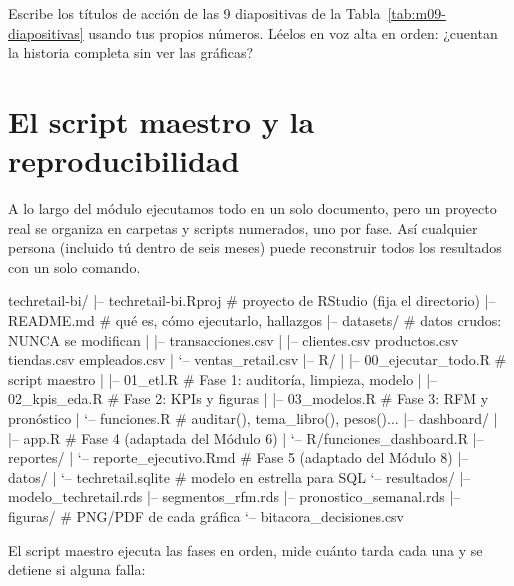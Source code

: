 \begin{hazlotu}
Escribe los títulos de acción de las 9 diapositivas de la
Tabla~\ref{tab:m09-diapositivas} usando tus propios números. Léelos en
voz alta en orden: ¿cuentan la historia completa sin ver las gráficas?
\end{hazlotu}

\section{El script maestro y la reproducibilidad}
\label{sec:m09-maestro}

A lo largo del módulo ejecutamos todo en un solo documento, pero un proyecto
real se organiza en carpetas y scripts numerados, uno por fase. Así
cualquier persona (incluido tú dentro de seis meses) puede reconstruir todos
los resultados con un solo comando.

\begin{textocodigo}[title=Estructura del proyecto]
techretail-bi/
|-- techretail-bi.Rproj        # proyecto de RStudio (fija el directorio)
|-- README.md                  # qué es, cómo ejecutarlo, hallazgos
|-- datasets/                  # datos crudos: NUNCA se modifican
|   |-- transacciones.csv
|   |-- clientes.csv  productos.csv  tiendas.csv  empleados.csv
|   `-- ventas_retail.csv
|-- R/
|   |-- 00_ejecutar_todo.R     # script maestro
|   |-- 01_etl.R               # Fase 1: auditoría, limpieza, modelo
|   |-- 02_kpis_eda.R          # Fase 2: KPIs y figuras
|   |-- 03_modelos.R           # Fase 3: RFM y pronóstico
|   `-- funciones.R            # auditar(), tema_libro(), pesos()...
|-- dashboard/
|   |-- app.R                  # Fase 4 (adaptada del Módulo 6)
|   `-- R/funciones_dashboard.R
|-- reportes/
|   `-- reporte_ejecutivo.Rmd  # Fase 5 (adaptado del Módulo 8)
|-- datos/
|   `-- techretail.sqlite      # modelo en estrella para SQL
`-- resultados/
    |-- modelo_techretail.rds
    |-- segmentos_rfm.rds
    |-- pronostico_semanal.rds
    |-- figuras/               # PNG/PDF de cada gráfica
    `-- bitacora_decisiones.csv
\end{textocodigo}

El script maestro ejecuta las fases en orden, mide cuánto tarda cada una y se
detiene si alguna falla:

